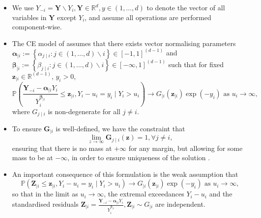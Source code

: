 \documentclass{article}
\numberwithin{equation}{section}
\begin{document}
\begin{itemize}
  \item We use $Y_{-i} = \bm{Y} \backslash Y_{i}, \bm{Y} \in \mathbb{R}^d, y \in (1, \ldots, d)$ to denote the vector of all variables in $\bm{Y}$ except $Y_i$, and assume all operations are performed component-wise.
  \item The CE model of \citet{Heffernan2004} assumes that there exists vector normalising parameters $\bm{\alpha}_{\mid i} := \left\{\alpha_{j \mid i} : j \in (1, \ldots, d) \backslash i \right\} \in [-1, 1]^{(d-1)}$ and $\bm{\beta}_{\mid i} := \left\{\beta_{j \mid i} : j \in (1, \ldots, d) \backslash i \right\} \in [-\infty, 1]^{(d-1)}$ such that for fixed $\bm{z}_{\mid i} \in \mathbb{R}^{(d-1)}$, $y_i > 0$,
      \begin{equation} \label{eq:ce_limiting_dist}
        \mathbb{P}\left( \frac{\bm{Y}_{-i} - \bm{\alpha}_{\mid i} Y_{i}}{Y_{i}^{\bm{\beta}_{\mid i}}} \le \bm{z}_{\mid i}, Y_i - u_i = y_i \mid Y_i > u_i \right) \rightarrow G_{\mid i}(\bm{z}_{\mid i}) \exp(-y_i) \text{ as } u_i \rightarrow \infty,
      \end{equation}
  where $G_{j \mid i}$ is non-degenerate for all $j \ne i$. 
  \item To ensure $\bm{G}_{\mid i}$ is well-defined, we have the constraint that 
  \[
    \lim_{z \rightarrow \infty}{\bm{G}_{j \mid i}(\bm{z})} = 1, \forall j \ne i,
  \]
  ensuring that there is no mass at $+\infty$ for any margin, but allowing for some mass to be at $-\infty$, in order to ensure uniqueness of the solution \citep{Keef2013}.
  \item An important consequence of this formulation is the weak assumption that
  \begin{equation} \label{eq:limit_independence}
    \mathbb{P}(\bm{Z}_{\mid i} \le \bm{z}_{\mid i}, Y_i - u_i = y_i \mid Y_i > u_i) \rightarrow G_{\mid i}(\bm{z}_{\mid i}) \exp(-y_i) \text{ as } u_i \rightarrow \infty,
  \end{equation}
  so that in the limit as $u_i \to \infty$, the extremal exceedances $Y_i - u_i$ and the standardised residuals $\bm{Z}_{\mid i} = \frac{\bm{Y}_{-i} - \bm{\alpha}_{\mid i} Y_{i}}{Y_{i}^{\bm{\beta}_{\mid i}}}, \bm{Z}_{\mid i} \sim G_{\mid i}$ are independent.
\end{itemize}
\end{document}
